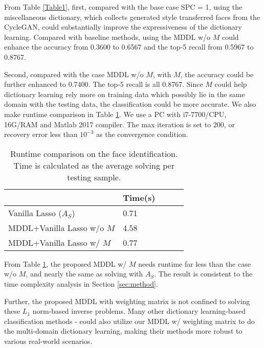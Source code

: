 \documentclass{article}
\begin{document}
From Table \ref{Table1}, first, compared with the base case SPC = 1, using the miscellaneous dictionary, which collects generated style transferred faces from the CycleGAN, could substantially improve the expressiveness of the dictionary learning. Compared with baseline methods, using the MDDL w/o $M$ could enhance the accuracy from 0.3600 to 0.6567 and the top-5 recall from 0.5967 to 0.8767. 

Second, compared with the case MDDL w/o $M$, with $M$, the accuracy could be further enhanced to 0.7400. The top-5 recall is all 0.8767. Since $M$ could help dictionary learning rely more on training data which possibly lie in the same domain with the testing data, the classification could be more accurate. We also make runtime comparison in Table \ref{Table2}. We use a PC with i7-7700/CPU, 16G/RAM and Matlab 2017 compiler. The max iteration is set to 200, or recovery error less than $10^{-3}$ as the convergence condition.

\begin{table}[!tb]
\caption{Runtime comparison on the face identification. Time is calculated as the average solving per testing sample.}
\label{Table2}
\begin{center}
\begin{tabular}{|l|l|l|l|l|}
\hline
                            & Time(s) \\ \hline
Vanilla Lasso ($A_S$)       & 0.71     \\ \hline
MDDL+Vanilla Lasso w/o $M$  & 4.58    \\ \hline
MDDL+Vanilla Lasso w/ $M$   & 0.77             \\ \hline
\end{tabular}
\end{center}
\end{table}

From Table \ref{Table2}, the proposed MDDL w/ $M$ needs runtime far less than the case w/o $M$, and nearly the same as solving with $A_S$. The result is consistent to the time complexity analysis in Section \ref{sec:method}.

Further, the proposed MDDL with weighting matrix is not confined to solving these $L_1$ norm-based inverse problems. Many other dictionary learning-based classification methods \cite{zhang2011iccv}-\cite{tang2018structured} could also utilize our MDDL w/ weighting matrix to do the multi-domain dictionary learning, making their methods more robust to various real-world scenarios.
\end{document}
